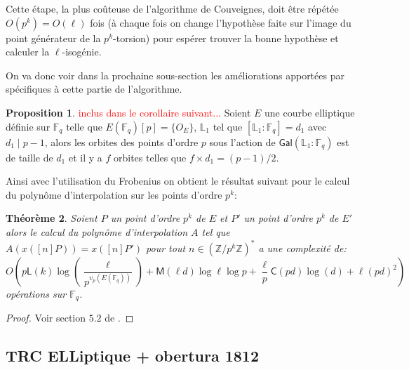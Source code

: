 \documentclass[10pt,a4paper]{book}
\theoremstyle{plain}
\newtheorem{thm}{Théorème}[chapter]
\theoremstyle{definition}
\theoremstyle{definition}
\theoremstyle{definition}
\newtheorem{prop}[thm]{Proposition}
\theoremstyle{definition}
\theoremstyle{remark}
\theoremstyle{remark}
\theoremstyle{definition}
\begin{document}
Cette étape, la plus coûteuse de l'algorithme de Couveignes, doit être répétée $O(p^k)=O(\ell)$ fois (à chaque fois on change l'hypothèse faite sur l'image du point générateur de la $p^k$-torsion) pour espérer trouver la bonne hypothèse et calculer la $\ell$-isogénie.

On va donc voir dans la prochaine sous-section les améliorations apportées par \cite{DeFeo11} spécifiques à cette partie de l'algorithme.

\begin{prop}
\textcolor{red}{inclus dans le corollaire suivant...}
Soient $E$ une courbe elliptique définie sur $\mathbb{F}_q$ telle que $E(\mathbb{F}_q)[p]=\{O_E\}$, $\mathbb{L}_1$ tel que $[\mathbb{L}_1:\mathbb{F}_q]=d_1$ avec $d_1 \mid p-1$, alors les orbites des points d'ordre $p$ sous l'action de $\mathsf{Gal}(\mathbb{L}_1:\mathbb{F}_q)$ est de taille de $d_1 $ et il y a $f$ orbites telles que $f \times d_1  = (p-1)/2$.
\end{prop}

Ainsi avec l'utilisation du Frobenius on obtient le résultat suivant pour le calcul du polynôme d'interpolation sur les points d'ordre $p^k$:

\begin{thm}
Soient $P$ un point d'ordre $p^k$ de $E$ et $P'$ un point d'ordre $p^k$ de $E'$ alors le calcul du polynôme d'interpolation $A$ tel que $A(x([n]P))=x([n]P')$ pour tout $n \in \left( \mathbb{Z}/p^k \mathbb{Z} \right)^*$ a une complexité de:
\[
O(p\mathsf{L}(k)\log(\frac{\ell}{p^{v_p(E(\mathbb{F}_q))}})+\mathsf{M}(\ell d)\log \ell \log p + \frac{\ell}{p}\mathsf{C}(pd)\log(d)+\ell (pd)^2)
\]
opérations sur $\mathbb{F}_q$.
\end{thm}

\begin{proof}
Voir section $5.2$ de \cite{DeFeo11}.
\end{proof}


\subsection{TRC ELLiptique + obertura 1812}
\end{document}
